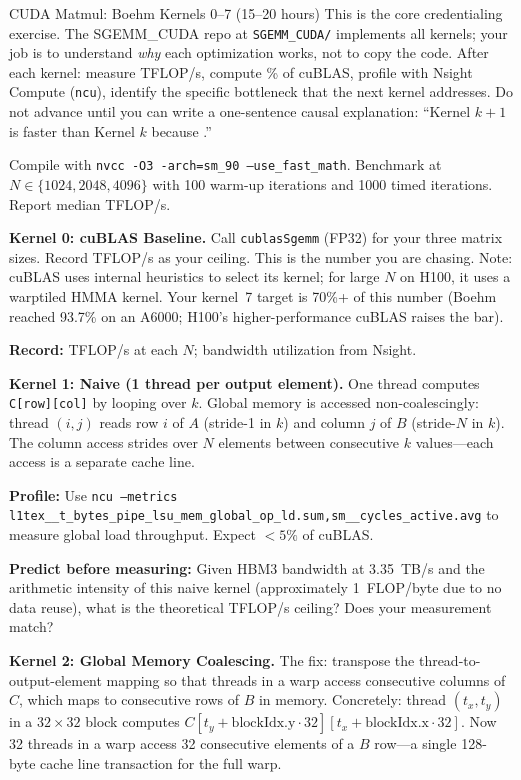 \begin{exercise}{CUDA Matmul: Boehm Kernels 0--7 (15--20 hours)}
This is the core credentialing exercise. The SGEMM\_CUDA repo at \texttt{SGEMM\_CUDA/} implements all kernels; your job is to understand \textit{why} each optimization works, not to copy the code. After each kernel: measure TFLOP/s, compute \% of cuBLAS, profile with Nsight Compute (\texttt{ncu}), identify the specific bottleneck that the next kernel addresses. Do not advance until you can write a one-sentence causal explanation: ``Kernel $k+1$ is faster than Kernel $k$ because \underline{\phantom{xxx}}.''

Compile with \texttt{nvcc -O3 -arch=sm\_90 --use\_fast\_math}. Benchmark at $N \in \{1024, 2048, 4096\}$ with 100 warm-up iterations and 1000 timed iterations. Report median TFLOP/s.

\medskip
\textbf{Kernel 0: cuBLAS Baseline.}
Call \texttt{cublasSgemm} (FP32) for your three matrix sizes. Record TFLOP/s as your ceiling. This is the number you are chasing. Note: cuBLAS uses internal heuristics to select its kernel; for large $N$ on H100, it uses a warptiled HMMA kernel. Your kernel~7 target is 70\%+ of this number (Boehm reached 93.7\% on an A6000; H100's higher-performance cuBLAS raises the bar).

\textbf{Record:} TFLOP/s at each $N$; bandwidth utilization from Nsight.

\medskip
\textbf{Kernel 1: Naive (1 thread per output element).}
One thread computes \texttt{C[row][col]} by looping over $k$. Global memory is accessed non-coalescingly: thread $(i,j)$ reads row $i$ of $A$ (stride-1 in $k$) and column $j$ of $B$ (stride-$N$ in $k$). The column access strides over $N$ elements between consecutive $k$ values---each access is a separate cache line.

\textbf{Profile:} Use \texttt{ncu --metrics l1tex\_\_t\_bytes\_pipe\_lsu\_mem\_global\_op\_ld.sum,sm\_\_cycles\_active.avg} to measure global load throughput. Expect $<5\%$ of cuBLAS.

\textbf{Predict before measuring:} Given HBM3 bandwidth at 3.35~TB/s and the arithmetic intensity of this naive kernel (approximately 1~FLOP/byte due to no data reuse), what is the theoretical TFLOP/s ceiling? Does your measurement match?

\medskip
\textbf{Kernel 2: Global Memory Coalescing.}
The fix: transpose the thread-to-output-element mapping so that threads in a warp access consecutive columns of $C$, which maps to consecutive rows of $B$ in memory. Concretely: thread $(t_x, t_y)$ in a $32 \times 32$ block computes $C[t_y + \text{blockIdx.y} \cdot 32][t_x + \text{blockIdx.x} \cdot 32]$. Now 32 threads in a warp access 32 consecutive elements of a $B$ row---a single 128-byte cache line transaction for the full warp.


\end{exercise}
